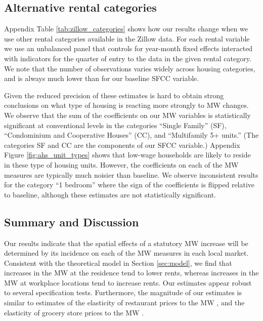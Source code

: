 \subsection{Alternative rental categories}

Appendix Table \ref{tab:zillow_categories} shows how our results change when we 
use other rental categories available in the Zillow data.
For each rental variable we use an unbalanced panel that controls for
year-month fixed effects interacted with indicators for the quarter of entry
to the data in the given rental category.
We note that the number of observations varies widely across housing categories, 
and is always much lower than for our baseline SFCC variable.

Given the reduced precision of these estimates is hard to obtain strong 
conclusions on what type of housing is reacting more strongly to MW changes.
We observe that the sum of the coefficients on our MW variables is 
statistically significant at conventional levels in the categories 
``Single Family'' (SF),  ``Condominium and Cooperative Houses'' (CC), and 
``Multifamily 5+ units.''
(The categories SF and CC are the components of our SFCC variable.)
Appendix Figure \ref{fig:ahs_unit_types} shows that low-wage households are 
likely to reside in these type of housing units.
However, the coefficients on each of the MW measures are typically much noisier 
than baseline.
We observe inconsistent results for the category ``1 bedroom'' where the sign 
of the coefficients is flipped relative to baseline, although these estimates 
are not statistically significant.

\subsection{Summary and Discussion}
\label{sec:results_discussion}

Our results indicate that the spatial effects of a statutory MW increase will 
be determined by its incidence on each of the MW measures in each local market.
Consistent with the theoretical model in Section \ref{sec:model}, we find that 
increases in the MW at the residence tend to lower rents, whereas increases 
in the MW at workplace locations tend to increase rents.
Our estimates appear robust to several specification tests.
Furthermore, the magnitude of our estimates is similar to estimates of the
elasticity of restaurant prices to the MW \parencite{AllegrettoReich2018},
and the elasticity of grocery store prices to the MW 
\parencite{RenkinEtAl2020, Leung2021}.

